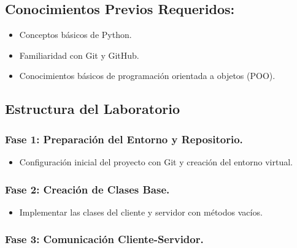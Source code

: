 \documentclass[
  a4paper,
  DIV=11,
  numbers=noendperiod,
  onepage,
  openany]{scrreprt}
\providecommand{\tightlist}{%
  \setlength{\itemsep}{0pt}\setlength{\parskip}{0pt}}\usepackage{longtable,booktabs,array}
\begin{document}
\subsection{Conocimientos Previos
Requeridos:}\label{conocimientos-previos-requeridos}

\begin{itemize}
\tightlist
\item
  Conceptos básicos de Python.
\item
  Familiaridad con Git y GitHub.
\item
  Conocimientos básicos de programación orientada a objetos (POO).
\end{itemize}

\subsection{Estructura del
Laboratorio}\label{estructura-del-laboratorio}

\subsubsection{\texorpdfstring{\textbf{Fase 1}: Preparación del Entorno
y
Repositorio.}{Fase 1: Preparación del Entorno y Repositorio.}}\label{fase-1-preparaciuxf3n-del-entorno-y-repositorio.}

\begin{itemize}
\tightlist
\item
  Configuración inicial del proyecto con Git y creación del entorno
  virtual.
\end{itemize}

\subsubsection{\texorpdfstring{\textbf{Fase 2}: Creación de Clases
Base.}{Fase 2: Creación de Clases Base.}}\label{fase-2-creaciuxf3n-de-clases-base.}

\begin{itemize}
\tightlist
\item
  Implementar las clases del cliente y servidor con métodos vacíos.
\end{itemize}

\subsubsection{\texorpdfstring{\textbf{Fase 3}: Comunicación
Cliente-Servidor.}{Fase 3: Comunicación Cliente-Servidor.}}\label{fase-3-comunicaciuxf3n-cliente-servidor.}
\end{document}
